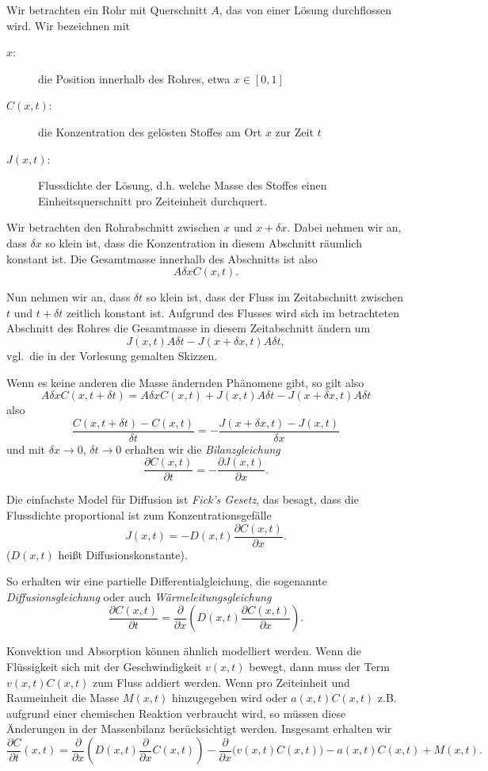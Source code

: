 \documentclass[
]{mycourse}
\theoremstyle{mythm}
\theoremstyle{break}
\begin{document}
Wir betrachten ein Rohr mit Querschnitt $A$, das von einer Lösung durchflossen wird. Wir bezeichnen mit
\begin{description}
\item[$x$:] die Position innerhalb des Rohres, etwa $x\in [0,1]$
\item[$C(x,t)$:] die Konzentration des gelösten Stoffes 
am Ort $x$ zur Zeit $t$
\item[$J(x,t)$:] Flussdichte der Lösung, d.h. welche Masse des Stoffes
einen Einheitsquerschnitt pro Zeiteinheit durchquert.
\end{description}

Wir betrachten den Rohrabschnitt zwischen $x$ und $x+\delta x$. Dabei nehmen wir an, dass
$\delta x$ so klein ist, dass die Konzentration in diesem Abschnitt
räumlich konstant ist. Die Gesamtmasse innerhalb des Abschnitts ist also
\[
A \delta x C(x,t).
\]

Nun nehmen wir an, dass $\delta t$ so klein ist, dass der Fluss im Zeitabschnitt zwischen $t$ und $t+\delta t$ zeitlich konstant ist. Aufgrund des Flusses wird sich im betrachteten Abschnitt des Rohres die Gesamtmasse in diesem Zeitabschnitt ändern um
\[
J(x,t)A \delta t - J(x+\delta x,t) A \delta t,
\]
vgl.\ die in der Vorlesung gemalten Skizzen.

Wenn es keine anderen die Masse ändernden Phänomene gibt, so gilt also
\[
A\delta x C(x,t+\delta t)=A\delta x C(x,t) + J(x,t)A \delta t - J(x+\delta x,t) A \delta t
\]
also
\[
\frac{C(x,t+\delta t)-C(x,t)}{\delta t}=-\frac{J(x+\delta x,t)-J(x,t)}{\delta x}
\]
und mit $\delta x\to 0$, $\delta t\to 0$ erhalten wir die \emph{Bilanzgleichung}
\[
\frac{\partial C(x,t)}{\partial t}=-\frac{\partial J(x,t)}{\partial x}.
\]

Die einfachste Model für Diffusion ist \emph{Fick's Gesetz}, das besagt, dass die
Flussdichte proportional ist zum Konzentrationsgefälle
\[
J(x,t)=- D(x,t) \frac{\partial C(x,t)}{\partial x}.
\]
($D(x,t)$ heißt Diffusionskonstante). %

So erhalten wir eine partielle Differentialgleichung, die sogenannte
\emph{Diffusionsgleichung} oder auch \emph{Wärmeleitungsgleichung}
\[
\frac{\partial C(x,t)}{\partial t}=\frac{\partial}{\partial x} \left(D(x,t) \frac{\partial  C(x,t)}{\partial x}\right).
\]

Konvektion und Absorption können ähnlich modelliert werden. Wenn die Flüssigkeit sich
mit der Geschwindigkeit $v(x,t)$ bewegt, dann muss der Term $v(x,t)C(x,t)$ zum Fluss addiert werden. Wenn pro Zeiteinheit und Raumeinheit die Masse $M(x,t)$ hinzugegeben wird oder $a(x,t)C(x,t)$ z.B. aufgrund einer chemischen Reaktion verbraucht wird, so müssen diese
Änderungen in der Massenbilanz berücksichtigt werden.
Insgesamt erhalten wir 
\[
\frac{\partial C}{\partial t}(x,t) =   \frac{\partial}{\partial x} \left( D(x,t) \frac{\partial}{\partial x} C(x,t)\right) - \frac{\partial}{\partial x} \Big(v(x,t) C(x,t)\Big) - a(x,t)C(x,t) + M(x,t). 
\]
\end{document}
